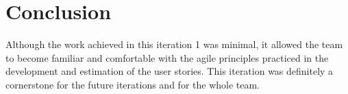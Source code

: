 \section{Conclusion}
Although the work achieved in this iteration 1 was minimal, it allowed the team to become familiar and comfortable with the agile principles practiced in the development and estimation of the user stories. This iteration was definitely a cornerstone for the future iterations and for the whole team.
